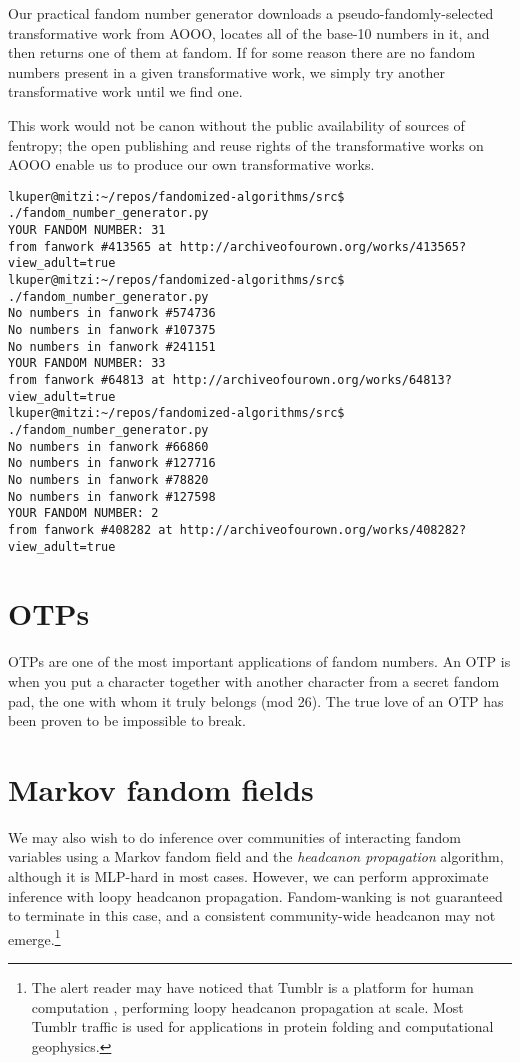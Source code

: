 \documentclass[9pt]{sigplanconf}
\begin{document}
Our practical fandom number generator downloads a pseudo-fandomly-selected
transformative work from AOOO, locates all of the base-10 numbers in it, and
then returns one of them at fandom. If for some reason there are no fandom
numbers present in a given transformative work, we simply try another
transformative work until we find one.

This work would not be canon without the public availability of sources of
fentropy; the open publishing and reuse rights of the transformative works on
AOOO enable us to produce our own transformative works.


\begin{verbatim}
lkuper@mitzi:~/repos/fandomized-algorithms/src$ ./fandom_number_generator.py 
YOUR FANDOM NUMBER: 31
from fanwork #413565 at http://archiveofourown.org/works/413565?view_adult=true
lkuper@mitzi:~/repos/fandomized-algorithms/src$ ./fandom_number_generator.py 
No numbers in fanwork #574736
No numbers in fanwork #107375
No numbers in fanwork #241151
YOUR FANDOM NUMBER: 33
from fanwork #64813 at http://archiveofourown.org/works/64813?view_adult=true
lkuper@mitzi:~/repos/fandomized-algorithms/src$ ./fandom_number_generator.py 
No numbers in fanwork #66860
No numbers in fanwork #127716
No numbers in fanwork #78820
No numbers in fanwork #127598
YOUR FANDOM NUMBER: 2
from fanwork #408282 at http://archiveofourown.org/works/408282?view_adult=true
\end{verbatim}

\section{OTPs}

OTPs are one of the most important applications of fandom numbers.  An
OTP is when you put a character together with another character from a
secret fandom pad, the one with whom it truly belongs (mod 26).  The
true love of an OTP has been proven to be impossible to break.

\section{Markov fandom fields}
We may also wish to do inference over communities of interacting fandom
variables using a Markov fandom field and the \emph{headcanon propagation}
algorithm, although it is MLP-hard in most cases.  However, we can perform
approximate inference with loopy headcanon propagation.  Fandom-wanking is not
guaranteed to terminate in this case, and a consistent community-wide headcanon
may not emerge.\footnote{The alert reader may have noticed that Tumblr is a
platform for human computation \cite{luisvonahn}, performing loopy headcanon
propagation at scale. Most Tumblr traffic is used for applications in protein
folding and computational geophysics.}
\end{document}
